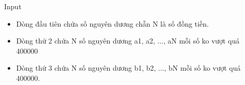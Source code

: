 Input
\begin{itemize}
	\item Dòng đầu tiên chứa số nguyên dương chẵn N là số đồng tiền.
	\item Dòng thứ 2 chứa N số nguyên dương a1, a2, ..., aN mỗi số ko vượt quá 400000
	\item Dòng thứ 3 chứa N số nguyên dương b1, b2, ..., bN mỗi số ko vượt quá 400000.
\end{itemize}
